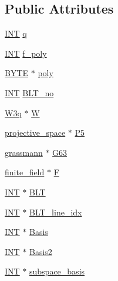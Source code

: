 \subsection*{Public Attributes}
\begin{DoxyCompactItemize}
\item 
\mbox{\hyperlink{galois_8h_a09fddde158a3a20bd2dcadb609de11dc}{I\+NT}} \mbox{\hyperlink{classknarr_a3fdb22a03f5252f8c4b29596feb648e8}{q}}
\item 
\mbox{\hyperlink{galois_8h_a09fddde158a3a20bd2dcadb609de11dc}{I\+NT}} \mbox{\hyperlink{classknarr_a1a384d24f79c6a50449665063be62b70}{f\+\_\+poly}}
\item 
\mbox{\hyperlink{galois_8h_ab6cc7b4aeb6ea31aba2b3fbfc83ff5e6}{B\+Y\+TE}} $\ast$ \mbox{\hyperlink{classknarr_a0d6419dc2f1ab767c8f5a47ec99e37fd}{poly}}
\item 
\mbox{\hyperlink{galois_8h_a09fddde158a3a20bd2dcadb609de11dc}{I\+NT}} \mbox{\hyperlink{classknarr_ad174ea563e958850b28f80ee997ba359}{B\+L\+T\+\_\+no}}
\item 
\mbox{\hyperlink{class_w3q}{W3q}} $\ast$ \mbox{\hyperlink{classknarr_afe8b72e915cfb715bfb78bc8cc33bc81}{W}}
\item 
\mbox{\hyperlink{classprojective__space}{projective\+\_\+space}} $\ast$ \mbox{\hyperlink{classknarr_a34c211a2932e4ca662d8f18e86138bd8}{P5}}
\item 
\mbox{\hyperlink{classgrassmann}{grassmann}} $\ast$ \mbox{\hyperlink{classknarr_ae64c7ca3aa8ef30547bd331d0c4b0738}{G63}}
\item 
\mbox{\hyperlink{classfinite__field}{finite\+\_\+field}} $\ast$ \mbox{\hyperlink{classknarr_aa0e365d405ed5af05b49ffa9c1b7a842}{F}}
\item 
\mbox{\hyperlink{galois_8h_a09fddde158a3a20bd2dcadb609de11dc}{I\+NT}} $\ast$ \mbox{\hyperlink{classknarr_aa24103a5cfe1ec902e534f050e5f9b07}{B\+LT}}
\item 
\mbox{\hyperlink{galois_8h_a09fddde158a3a20bd2dcadb609de11dc}{I\+NT}} $\ast$ \mbox{\hyperlink{classknarr_ae3421bd219ebf6a42be456ae5a8e50ae}{B\+L\+T\+\_\+line\+\_\+idx}}
\item 
\mbox{\hyperlink{galois_8h_a09fddde158a3a20bd2dcadb609de11dc}{I\+NT}} $\ast$ \mbox{\hyperlink{classknarr_add68481c45ca4309285991525d4a3561}{Basis}}
\item 
\mbox{\hyperlink{galois_8h_a09fddde158a3a20bd2dcadb609de11dc}{I\+NT}} $\ast$ \mbox{\hyperlink{classknarr_a11fca253d8533fab23f02f9c061860f1}{Basis2}}
\item 
\mbox{\hyperlink{galois_8h_a09fddde158a3a20bd2dcadb609de11dc}{I\+NT}} $\ast$ \mbox{\hyperlink{classknarr_a58338765fda373d2c624d41f787a51aa}{subspace\+\_\+basis}}

\end{DoxyCompactItemize}
